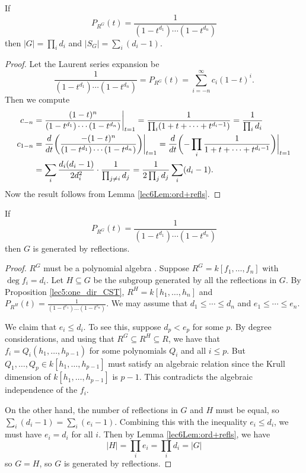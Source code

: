 \begin{proposition}\label{lec6Prop:almost_CST}
 If  
 \[
  P_{R^G}(t)= \frac{1}{(1-t^{d_1})\cdots (1-t^{d_n})}
 \]
 then $|G|=\prod_i d_i$ and $|S_G|=\sum_i (d_i-1)$.
\end{proposition}
\begin{proof}
 Let the Laurent series expansion be
 \[
  \frac{1}{(1-t^{d_1})\cdots (1-t^{d_n})} = P_{R^G}(t) = \sum_{i=-n}^\infty c_i (1-t)^i.
 \]
 Then we compute
 \begin{align*}
  c_{-n} &= \frac{(1-t)^n}{(1-t^{d_1})\cdots (1-t^{d_n})}\biggr|_{t=1} =\frac{1}{\prod_i(1+t+\cdots +t^{d_i-1})} = \frac{1}{\prod_i d_i}\\
  c_{1-n} &= \frac{d }{d t}\biggl(\frac{-(1-t)^n}{(1-t^{d_1})\cdots (1-t^{d_n})}\biggr)\biggr|_{t=1}= \frac{d }{d t}\biggl(-\prod_i\frac{1}{1+t+\cdots +t^{d_i-1}}\biggr)\biggr|_{t=1}\\
  &= \sum_i \frac{d_i(d_i-1)}{2d_i^2}\cdot \frac{1}{\prod_{j\neq i} d_j} = \frac{1}{2\prod_j d_j} \sum_i (d_i-1).
 \end{align*}
 Now the result follows from Lemma \ref{lec6Lem:ord+refls}.
\end{proof}
\begin{proposition}\label{lec6Prop:other_dir_CST}
 If
 \[
  P_{R^G}(t)= \frac{1}{(1-t^{d_1})\cdots (1-t^{d_n})}
 \]
 then $G$ is generated by reflections.
\end{proposition}
\begin{proof}
  $R^G$ must be a polynomial algebra . Suppose $R^G=k[f_1,\dots, f_n]$ with $\deg f_i=d_i$. Let $H\subseteq G$ be the subgroup generated by all the reflections in $G$. By Proposition \ref{lec5:one_dir_CST}, $R^H=k[h_1,\dots, h_n]$ and $P_{R^H}(t)=\frac{1}{(1-t^{e_1})\dots (1-t^{e_n})}$. We may assume that $d_1\le \cdots \le d_n$ and $e_1\le \cdots \le e_n$.

 We claim that $e_i\le d_i$. To see this, suppose $d_p<e_p$ for some $p$. By degree considerations, and using that $R^G\subseteq R^H\subseteq R$, we have that $f_i= Q_i(h_1,\dots, h_{p-1})$ for some polynomials $Q_i$ and all $i\le p$. But $Q_1,\dots, Q_p\in k[h_1,\dots, h_{p-1}]$ must satisfy an algebraic relation since the Krull dimension of $k[h_1,\dots, h_{p-1}]$ is $p-1$. This contradicts the algebraic independence of the $f_i$.

 On the other hand, the number of reflections in $G$ and $H$ must be equal, so $\sum_i (d_i-1)=\sum_i (e_i-1)$. Combining this with the inequality $e_i\le d_i$, we must have $e_i=d_i$ for all $i$. Then by Lemma \ref{lec6Lem:ord+refls}, we have
 \[
  |H| = \prod_i e_i =\prod_i d_i=|G|
 \]
 so $G=H$, so $G$ is generated by reflections.
\end{proof}
